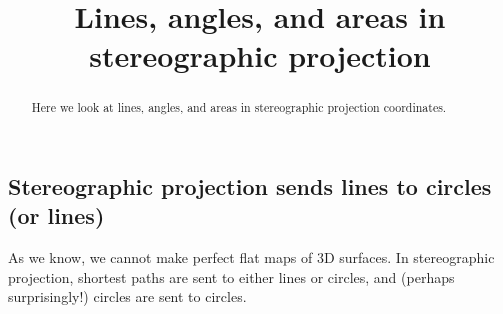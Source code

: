 \documentclass[newpage,hints,12pt,noauthor,nooutcomes]{ximera}
\title{Lines, angles, and areas in stereographic projection}
\begin{document}
\begin{abstract}
Here we look at lines, angles, and areas in stereographic projection coordinates.
\end{abstract}
\maketitle


\subsection{Stereographic projection sends lines to circles (or lines)}

As we know, we cannot make perfect flat maps of 3D surfaces. In stereographic
projection, shortest paths are sent to either lines or circles, and (perhaps
surprisingly!) circles are sent to circles.
\end{document}
